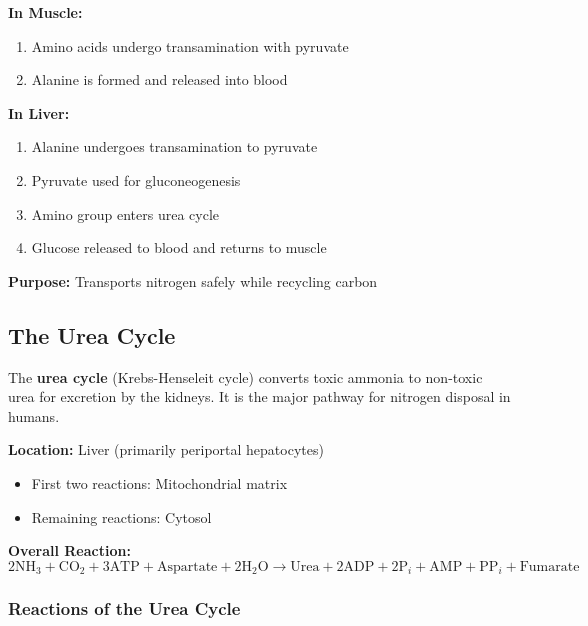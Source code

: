 \begin{tcolorbox}[colback=green!5, colframe=green!70!black, title=\textbf{Glucose-Alanine Cycle}]
\textbf{In Muscle:}
\begin{enumerate}
    \item Amino acids undergo transamination with pyruvate
    \item Alanine is formed and released into blood
\end{enumerate}

\textbf{In Liver:}
\begin{enumerate}
    \item Alanine undergoes transamination to pyruvate
    \item Pyruvate used for gluconeogenesis
    \item Amino group enters urea cycle
    \item Glucose released to blood and returns to muscle
\end{enumerate}

\textbf{Purpose:} Transports nitrogen safely while recycling carbon
\end{tcolorbox}

\subsection{The Urea Cycle}

\begin{definition}
The \textbf{urea cycle} (Krebs-Henseleit cycle) converts toxic ammonia to non-toxic urea for excretion by the kidneys. It is the major pathway for nitrogen disposal in humans.
\end{definition}

\textbf{Location:} Liver (primarily periportal hepatocytes)
\begin{itemize}
    \item First two reactions: Mitochondrial matrix
    \item Remaining reactions: Cytosol
\end{itemize}

\textbf{Overall Reaction:}
\[
2\text{NH}_3 + \text{CO}_2 + 3\text{ATP} + \text{Aspartate} + 2\text{H}_2\text{O} \rightarrow \text{Urea} + 2\text{ADP} + 2\text{P}_i + \text{AMP} + \text{PP}_i + \text{Fumarate}
\]

\subsubsection{Reactions of the Urea Cycle}

